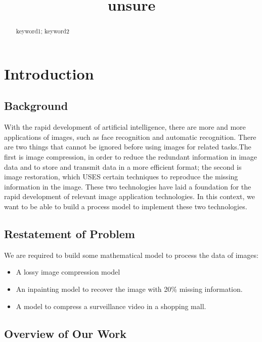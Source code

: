 \documentclass{mcmthesis}
\title{unsure}
\begin{document}
\begin{abstract}
\lipsum[1]
\begin{keywords}
keyword1; keyword2
\end{keywords}
\end{abstract}
\maketitle
\section{Introduction}
\subsection{Background}

With the rapid development of artificial intelligence, there are more and more applications of images, such as face recognition and automatic recognition. There are two things that cannot be ignored before using images for related tasks.The first is image compression, in order to reduce the redundant information in image data and to store and transmit data in a more efficient format; the second is image restoration, which USES certain techniques to reproduce the missing information in the image.  These two technologies have laid a foundation for the rapid development of relevant image application technologies. In this context, we want to be able to build a process model to implement these two technologies.

\subsection{Restatement of Problem}

We are required to build some mathematical model to process the data of images:
\begin{itemize}
\item A lossy image compression model
\item An inpainting model to recover the image with 20\% missing information.
\item A model to compress a surveillance video in a shopping mall.
\end{itemize}

\subsection{Overview of Our Work}
\end{document}
